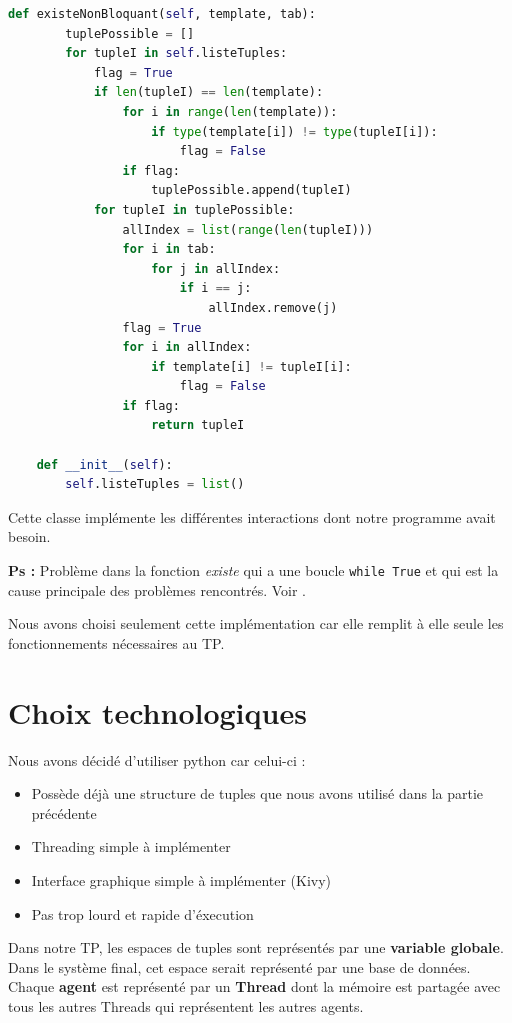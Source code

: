 \documentclass[a4paper,10pt]{article}
\begin{document}
\begin{lstlisting}[language=Python]
    def existeNonBloquant(self, template, tab):
        tuplePossible = []
        for tupleI in self.listeTuples:
            flag = True
            if len(tupleI) == len(template):
                for i in range(len(template)):
                    if type(template[i]) != type(tupleI[i]):
                        flag = False
                if flag:
                    tuplePossible.append(tupleI)
            for tupleI in tuplePossible:
                allIndex = list(range(len(tupleI)))
                for i in tab:
                    for j in allIndex:
                        if i == j:
                            allIndex.remove(j)
                flag = True
                for i in allIndex:
                    if template[i] != tupleI[i]:
                        flag = False
                if flag:
                    return tupleI

    def __init__(self):
        self.listeTuples = list()

    \end{lstlisting}
    Cette classe implémente les différentes interactions dont notre programme avait besoin. 

    \textbf{Ps : } Problème dans la fonction \textit{existe} qui a une boucle \verb|while True| et qui est la cause principale des problèmes rencontrés. Voir .

    
    \par Nous avons choisi seulement cette implémentation car elle remplit à elle seule les fonctionnements nécessaires au TP.   

    \pagebreak
    \section{Choix technologiques}
    Nous avons décidé d'utiliser python car celui-ci :
    \begin{itemize}
        \item Possède déjà une structure de tuples que nous avons utilisé dans la partie précédente
        \item Threading simple à implémenter
        \item Interface graphique simple à implémenter (Kivy)
        \item Pas trop lourd et rapide d'éxecution
    \end{itemize} 

    Dans notre TP, les espaces de tuples sont représentés par une \textbf{variable globale}. Dans le système final, cet espace serait représenté par une base de données. Chaque \textbf{agent} est représenté par un \textbf{Thread} dont la mémoire est partagée avec tous les autres Threads qui représentent les autres agents.
\end{document}
